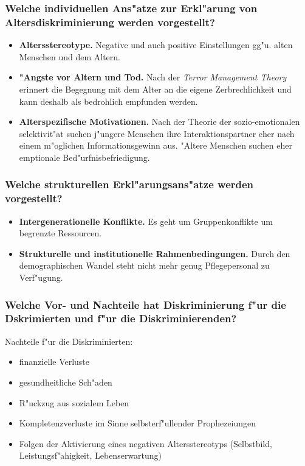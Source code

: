 \subsubsection{Welche individuellen Ans"atze zur Erkl"arung von Altersdiskriminierung werden vorgestellt?}
\begin{itemize}
        \item \textbf{Altersstereotype.} Negative und auch positive Einstellungen gg"u. alten Menschen und dem Altern.
        \item \textbf{"Angste vor Altern und Tod.} Nach der \emph{Terror Management Theory} erinnert die Begegnung mit dem Alter an die eigene Zerbrechlichkeit und kann deshalb als bedrohlich empfunden werden.
        \item \textbf{Alterspezifische Motivationen.} Nach der Theorie der sozio-emotionalen selektivit"at suchen j"ungere Menschen ihre Interaktionspartner eher nach einem m"oglichen Informationsgewinn aus. "Altere Menschen suchen eher emptionale Bed"urfnisbefriedigung.
\end{itemize}

\subsubsection{Welche strukturellen Erkl"arungsans"atze werden vorgestellt?}
\begin{itemize}
        \item \textbf{Intergenerationelle Konflikte.} Es geht um Gruppenkonflikte um begrenzte Ressourcen.
        \item \textbf{Strukturelle und institutionelle Rahmenbedingungen.} Durch den demographischen Wandel steht nicht mehr genug Pflegepersonal zu Verf"ugung.
\end{itemize}
\subsubsection{Welche Vor- und Nachteile hat Diskriminierung f"ur die Dskrimierten und f"ur die Diskriminierenden?}
Nachteile f"ur die Diskriminierten:
\begin{itemize}
        \item finanzielle Verluste
        \item gesundheitliche Sch"aden
        \item R"uckzug aus sozialem Leben
        \item Kompletenzverluste im Sinne selbsterf"ullender Prophezeiungen
        \item Folgen der Aktivierung eines negativen Altersstereotyps (Selbstbild, Leistungsf"ahigkeit, Lebenserwartung)
\end{itemize}


